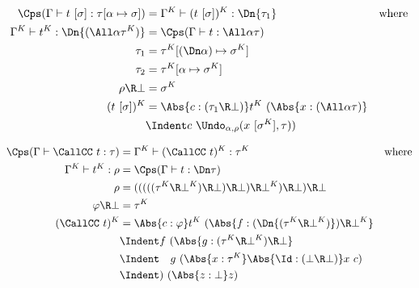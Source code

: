 \documentclass{amsart}
\let\phi=\varphi %
\begin{document}
\begin{align*}
\Cps(\Gamma \vdash t~[\sigma] : \tau[\alpha\mapsto\sigma]) & =
  \Gamma^K \vdash (t~[\sigma])^K :
  \Dn{\tau_1}
  & \mbox{where}
  \\
\Gamma^K \vdash t^K : \Dn{(\All\alpha \tau^K)} & =
  \Cps(\Gamma \vdash t : \All\alpha \tau)
  \\
\tau_1 & = \tau^K[(\Dn\alpha) \mapsto \sigma^K]
  \\
\tau_2 & = \tau^K[\alpha \mapsto \sigma^K]
  \\
\rho \R \bot & = \sigma^K
  \\
 (t~[\sigma])^K & =
  \Abs{c : (\tau_1 \R \bot)} t^K~(\Abs{x : (\All\alpha\tau)} \\
  &\Indent
  c~\Undo_{\alpha,\rho}(x~[\sigma^K], \tau))
\end{align*}

\begin{align*}
\Cps(\Gamma \vdash \CallCC~t : \tau) & =
  \Gamma^K \vdash (\CallCC~t)^K : \tau^K
  &\mbox{where}
  \\
\Gamma^K \vdash t^K : \rho & =
  \Cps(\Gamma \vdash t : \Dn\tau)
  \\
\rho & =
  (((((\tau^K \R \bot^K) \R\bot)\R\bot)
    \R \bot^K) \R\bot)\R\bot
  \\
\phi \R \bot & = \tau^K
  \\
(\CallCC~t)^K & =
  \Abs{c : \phi}
  t^K~(\Abs{f : (\Dn{(\tau^K\R\bot^K)}) \R \bot^K}
  \\ &\Indent
  f~(
  \Abs{g : (\tau^K \R \bot^K) \R \bot}
  \\ &\Indent\hspace{1em}
  g~(\Abs{x:\tau^K} \Abs{\Id : (\bot \R \bot)} x~c)
  \\ &\Indent
  )~(\Abs{z:\bot} z)
\end{align*}
\end{document}
